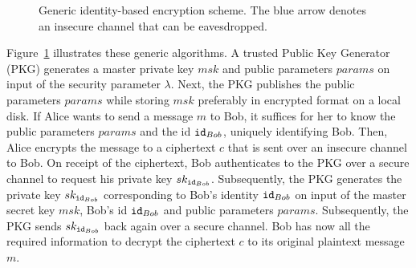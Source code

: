 \begin{figure}[ht]
\begin{center}
{
    }
    \end{center}
    \caption{Generic identity-based encryption scheme. The blue arrow denotes an insecure channel that can be eavesdropped.}
    \label{fig:generic_ibe_scheme}
\end{figure}

Figure~\ref{fig:generic_ibe_scheme} illustrates these generic algorithms. A trusted Public Key Generator (PKG) generates a master private key $msk$ and public parameters $params$ on input of the security parameter $\lambda$. Next, the PKG publishes the public parameters $params$ while storing $msk$ preferably in encrypted format on a local disk. If Alice wants to send a message $m$ to Bob, it suffices for her to know the public parameters $params$ and the id $\mathtt{id}_{Bob}$, uniquely identifying Bob. Then, Alice encrypts the message to a ciphertext $c$ that is sent over an insecure channel to Bob. On receipt of the ciphertext, Bob authenticates to the PKG over a secure channel to request his private key $sk_{\mathtt{id}_{Bob}}$. Subsequently, the PKG generates the private key $sk_{\mathtt{id}_{Bob}}$ corresponding to Bob's identity $\mathtt{id}_{Bob}$ on input of the master secret key $msk$, Bob's id $\mathtt{id}_{Bob}$ and public parameters $params$. Subsequently, the PKG sends $sk_{\mathtt{id}_{Bob}}$ back again over a secure channel. Bob has now all the required information to decrypt the ciphertext $c$ to its original plaintext message $m$.

